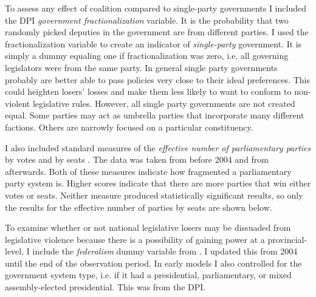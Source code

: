 \documentclass[a4paper]{article}\usepackage[]{graphicx}\usepackage[]{color}
\begin{document}
To assess any effect of coalition compared to single-party governments I included the DPI {\emph{government fractionalization}} variable. It is the probability that two randomly picked deputies in the government are from different parties. I used the fractionalization variable to create an indicator of {\emph{single-party}} government. It is simply a dummy equaling one if fractionalization was zero, i.e. all governing legislators were from the same party. In general single party governments probably are better able to pass policies very close to their ideal preferences. This could heighten losers' losses and make them less likely to want to conform to non-violent legislative rules. However, all single party governments are not created equal. Some parties may act as umbrella parties that incorporate many different factions. Others are narrowly focused on a particular constituency.

I also included standard measures of the \emph{effective number of parliamentary parties} by votes and by seats \citep[see][]{Laakso1979, Taagepera1989}. The data was taken from \cite{Carey2011} before 2004 and from \cite{Gallagher2012} afterwards. Both of these measures indicate how fragmented a parliamentary party system is. Higher scores indicate that there are more parties that win either votes or seats. Neither measure produced statistically significant results, so only the results for the effective number of parties by seats are shown below.

To examine whether or not national legislative losers may be dissuaded from legislative violence because there is a possibility of gaining power at a provincial-level, I include the \emph{federalism} dummy variable from \cite{Carey2011}. I updated this from 2004 until the end of the observation period. In early models I also controlled for the government system type, i.e. if it had a presidential, parliamentary, or mixed assembly-elected presidential. This was from the DPI.
\end{document}
